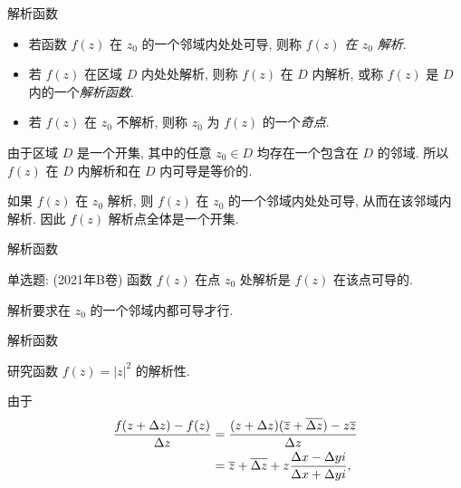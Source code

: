 \begin{frame}{解析函数}
	\onslide<+->
	\begin{definition}
		\begin{itemize}
			\item 若函数 $f(z)$ 在 $z_0$ 的一个邻域内处处可导, 则称 \emph{$f(z)$ 在 $z_0$ 解析}.
			\item 若 $f(z)$ 在区域 $D$ 内处处解析, 则称 $f(z)$ 在 $D$ 内解析, 或称 $f(z)$ 是 $D$ 内的一个\emph{解析函数}.
			\item 若 $f(z)$ 在 $z_0$ 不解析, 则称 $z_0$ 为 $f(z)$ 的一个\emph{奇点}.
		\end{itemize}
	\end{definition}

	\onslide<+->
	由于区域 $D$ 是一个开集, 其中的任意 $z_0\in D$ 均存在一个包含在 $D$ 的邻域. 
	\onslide<+->
	所以 \alert{$f(z)$ 在 $D$ 内解析和在 $D$ 内可导是等价的}.

	\onslide<+->
	如果 $f(z)$ 在 $z_0$ 解析, 则 $f(z)$ 在 $z_0$ 的一个邻域内处处可导, 从而在该邻域内解析.
	\onslide<+->
	因此 \alert{$f(z)$ 解析点全体是一个开集}.
\end{frame}


\begin{frame}{解析函数}
	\onslide<+->
	\begin{exercise}
		单选题: (2021年B卷) 函数 $f(z)$ 在点 $z_0$ 处解析是 $f(z)$ 在该点可导的.
	\end{exercise}

	\onslide<+->
	\begin{answer}
		解析要求在 $z_0$ 的一个邻域内都可导才行.
	\end{answer}
\end{frame}

\begin{frame}{解析函数}
	\onslide<+->
	\begin{example}
		研究函数 $f(z)=|z|^2$ 的解析性.
	\end{example}

	\onslide<+->
	\begin{solution*}
		由于
		\vspace{-6pt}
		\begin{align*}
			\frac{f(z+\Delta z)-f(z)}{\Delta z}
			&=\frac{(z+\Delta z)(\overline z+\overline{\Delta z})-z\overline z}{\Delta z}\\
			&=\overline z+\overline{\Delta z}+z\frac{\Delta x-\Delta yi}{\Delta x+\Delta yi},
		\end{align*}



	\end{solution*}
\end{frame}

